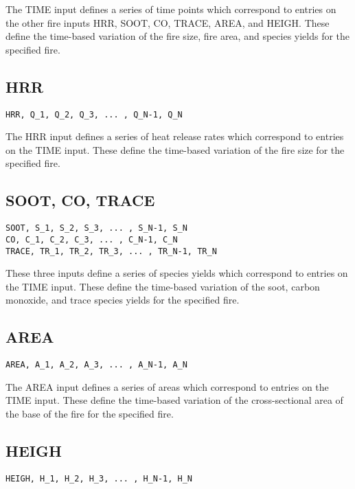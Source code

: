 The TIME input defines a series of time points which correspond to entries on the other fire inputs HRR, SOOT, CO, TRACE, AREA, and HEIGH.  These define the time-based variation of the fire size, fire area, and species yields for the specified fire.

\subsection{HRR}

\begin{lstlisting}
HRR, Q_1, Q_2, Q_3, ... , Q_N-1, Q_N
\end{lstlisting}

The HRR input defines a series of heat release rates which correspond to entries on the TIME input.  These define the time-based variation of the fire size for the specified fire.

\subsection{SOOT, CO, TRACE}

\begin{lstlisting}
SOOT, S_1, S_2, S_3, ... , S_N-1, S_N
CO, C_1, C_2, C_3, ... , C_N-1, C_N
TRACE, TR_1, TR_2, TR_3, ... , TR_N-1, TR_N
\end{lstlisting}

These three inputs define a series of species yields which correspond to entries on the TIME input.  These define the time-based variation of the soot, carbon monoxide, and trace species yields for the specified fire.

\subsection{AREA}

\begin{lstlisting}
AREA, A_1, A_2, A_3, ... , A_N-1, A_N
\end{lstlisting}

The AREA input defines a series of areas which correspond to entries on the TIME input.  These define the time-based variation of the cross-sectional area of the base of the fire for the specified fire.

\subsection{HEIGH}

\begin{lstlisting}
HEIGH, H_1, H_2, H_3, ... , H_N-1, H_N
\end{lstlisting}


